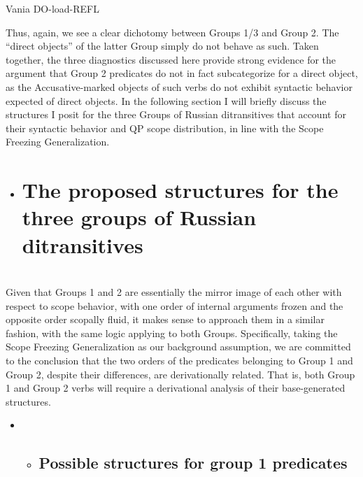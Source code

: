 \documentclass[output=paper,modfonts, nonflat]{langsci/langscibook}
\begin{document}
\begin{styleinnerExample}
      Vania DO-load-REFL
\end{styleinnerExample}

Thus, again, we see a clear dichotomy between Groups 1/3 and Group 2. The “direct objects” of the latter Group simply do not behave as such. Taken together, the three diagnostics discussed here provide strong evidence for the argument that Group 2 predicates do not in fact subcategorize for a direct object, as the Accusative-marked objects of such verbs do not exhibit syntactic behavior expected of direct objects. In the following section I will briefly discuss the structures I posit for the three Groups of Russian ditransitives that account for their syntactic behavior and QP scope distribution, in line with the Scope Freezing Generalization.

\begin{itemize}
\item \section{The proposed structures for the three groups of Russian ditransitives}
\end{itemize}

\\
Given that Groups 1 and 2 are essentially the mirror image of each other with respect to scope behavior, with one order of internal arguments frozen and the opposite order scopally fluid, it makes sense to approach them in a similar fashion, with the same logic applying to both Groups. Specifically, taking the Scope Freezing Generalization as our background assumption, we are committed to the conclusion that the two orders of the predicates belonging to Group 1 and Group 2, despite their differences, are derivationally related. That is, both Group 1 and Group 2 verbs will require a derivational analysis of their base-generated structures.

\begin{itemize}
\item \begin{itemize}
\item \subsection{Possible structures for group 1 predicates}
\end{itemize}
\end{itemize}
\end{document}
